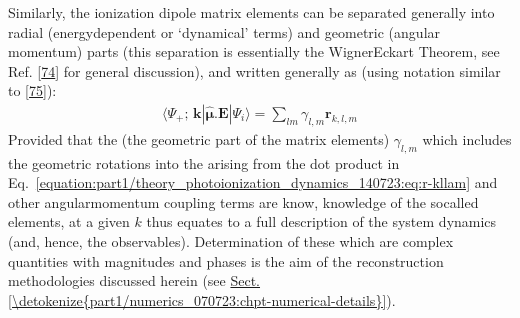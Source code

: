 \documentclass[letterpaper,table,10pt,english]{jupyterBook}
\begin{document}
\sphinxAtStartPar
Similarly, the ionization dipole matrix elements can be separated
generally into radial (energy\sphinxhyphen{}dependent or ‘dynamical’ terms) and
geometric (angular momentum) parts (this separation is essentially the
Wigner\sphinxhyphen{}Eckart Theorem, see Ref. {[}\hyperlink{cite.backmatter/bibliography:id968}{74}{]} for general discussion),
and written generally as (using notation similar to {[}\hyperlink{cite.backmatter/bibliography:id817}{75}{]}):
\begin{equation}\label{equation:part1/theory_photoionization_dynamics_140723:eq:r-kllam}
\begin{split}\langle\Psi_{+};\,\mathbf{k}|\hat{\boldsymbol{\mu}}.\boldsymbol{\mathbf{E}}|\Psi_{i}\rangle = \sum_{lm}\gamma_{l,m}\mathbf{r}_{k,l,m}
\end{split}
\end{equation}
\sphinxAtStartPar
Provided that the {\hyperref[\detokenize{backmatter/glossary:term-geometric-coupling-parameters}]{}} (the geometric part of the matrix elements) \(\gamma_{l,m}\) \sphinxhyphen{}
which includes the geometric rotations into the {\hyperref[\detokenize{backmatter/glossary:term-LF}]{}} arising from the dot
product in Eq. \eqref{equation:part1/theory_photoionization_dynamics_140723:eq:r-kllam} and other angular\sphinxhyphen{}momentum coupling terms \sphinxhyphen{} are
know, knowledge of the so\sphinxhyphen{}called {\hyperref[\detokenize{backmatter/glossary:term-radial-matrix-elements}]{}}
elements, at a given \(k\) thus equates to a full description of the
system dynamics (and, hence, the observables). Determination of these {\hyperref[\detokenize{backmatter/glossary:term-radial-matrix-elements}]{}} \sphinxhyphen{} which are complex quantities with magnitudes and phases \sphinxhyphen{} is the aim of the reconstruction methodologies discussed herein (see \hyperref[\detokenize{part1/numerics_070723:chpt-numerical-details}]{Sect.\@ \ref{\detokenize{part1/numerics_070723:chpt-numerical-details}}}).
\end{document}
